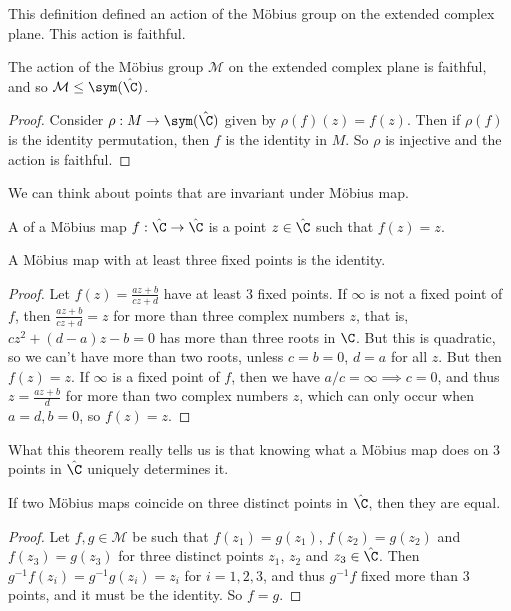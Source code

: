 \documentclass[a4paper]{scrartcl}
\begin{document}
This definition defined an action of the Möbius group on the extended complex plane. This action is faithful.

\begin{proposition}
	The action of the Möbius group $\mathcal{M}$ on the extended complex plane is faithful, and so $\mathcal{M} \leq \sym(\hat{\C})$.
\end{proposition}
\begin{proof}
	Consider $\rho : M \rightarrow \sym(\hat{\C})$ given by $\rho(f)(z) = f(z)$. Then if $\rho(f)$ is the identity permutation, then $f$ is the identity in $M$. So $\rho$ is injective and the action is faithful.
\end{proof}

We can think about points that are invariant under Möbius map.

\begin{definition}
	A  of a Möbius map $f: \hat{\C} 	\rightarrow \hat{\C}$ is a point $z \in \hat{\C}$ such that $f(z) = z$.
\end{definition}

\begin{theorem}
	A Möbius map with at least three fixed points is the identity.
\end{theorem}
\begin{proof}
Let $f(z) = \frac{az + b}{cz + d}$ have at least 3 fixed points. If $\infty$ is not a fixed point of $f$, then $\frac{az + b}{cz + d} = z$ for more than three complex numbers $z$, that is, $cz^2 + (d - a)z - b = 0$ has more than three roots in $\C$. But this is quadratic, so we can't have more than two roots, unless $c = b = 0$, $d = a$ for all $z$. But then $f(z) = z$. If $\infty$ is a fixed point of $f$, then we have $a/c = \infty \implies c = 0$, and thus $z = \frac{az + b}{d}$ for more than two complex numbers $z$, which can only occur when $a = d, b = 0$, so $f(z) = z$.
\end{proof}

What this theorem really tells us is that knowing what a Möbius map does on 3 points in $\hat{\C}$ uniquely determines it.

\begin{corollary}
	If two Möbius maps coincide on three distinct points in $\hat{\C}$, then they are equal.
\end{corollary}
\begin{proof}
	Let $f, g \in \mathcal{M}$ be such that $f(z_1) = g(z_1)$, $f(z_2) = g(z_2)$ and $f(z_3) = g(z_3)$ for three distinct points $z_1$, $z_2$ and $z_3 \in \hat{\C}$. Then $g^{-1}f(z_i) = g^{-1} g(z_i) = z_i$ for $i = 1, 2, 3$, and thus $g^{-1}f$ fixed more than 3 points, and it must be the identity. So $f = g$.
\end{proof}
\end{document}
